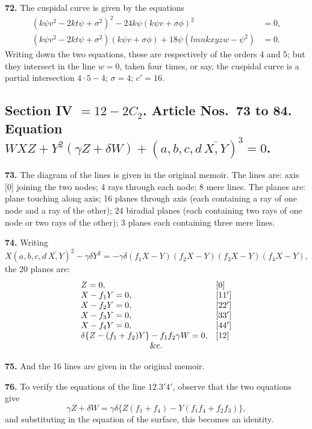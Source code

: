\documentclass[11pt,a4paper]{article}
\theoremstyle{definition}
\begin{document}
\textbf{72.} The cuspidal curve is given by the equations
\begin{align*}
(k\psi v^2 - 2kt\psi + \sigma^2)^2 - 24k\psi(k\psi v + \sigma\phi)^2 &= 0, \\
(k\psi v^2 - 2kt\psi + \sigma^2)(k\psi v + \sigma\phi) + 18\psi(lmnkxyzw - \psi^2) &= 0.
\end{align*}
Writing down the two equations, these are respectively of the orders 4 and 5; but they intersect in the line $w = 0$, taken four times, or say, the cuspidal curve is a partial intersection $4 \cdot 5 - 4$; $\sigma = 4$; $c' = 16$.

\newpage
\setcounter{page}{396}

\subsection*{Section IV $= 12 - 2C_2$. Article Nos.~73 to 84. Equation $WXZ + Y^2(\gamma Z + \delta W) + (a, b, c, d \,\overline{\!\!X, Y\!\!})^3 = 0$.}

\textbf{73.} The diagram of the lines is given in the original memoir. The lines are: axis [0] joining the two nodes; 4 rays through each node; 8 mere lines. The planes are: plane touching along axis; 16 planes through axis (each containing a ray of one node and a ray of the other); 24 biradial planes (each containing two rays of one node or two rays of the other); 3 planes each containing three mere lines.

\textbf{74.} Writing
\[
X(a, b, c, d \,\overline{\!\!X, Y\!\!})^2 - \gamma\delta Y^2 = -\gamma\delta(f_1X - Y)(f_2X - Y)(f_3X - Y)(f_4X - Y),
\]
the 20 planes are:
\[
\begin{array}{ll}
Z = 0, & [0] \\
X - f_1Y = 0, & [11'] \\
X - f_2Y = 0, & [22'] \\
X - f_3Y = 0, & [33'] \\
X - f_4Y = 0, & [44'] \\
\delta\{Z - (f_1 + f_2)Y\} - f_1f_2\gamma W = 0, & [12] \\
\multicolumn{2}{c}{\text{\&c.}}
\end{array}
\]

\textbf{75.} And the 16 lines are given in the original memoir.

\textbf{76.} To verify the equations of the line $12.3'4'$, observe that the two equations give
\[
\gamma Z + \delta W = \gamma\delta\{Z(f_1 + f_4) - Y(f_1f_4 + f_2f_3)\},
\]
and substituting in the equation of the surface, this becomes an identity.
\end{document}
